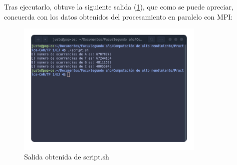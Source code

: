Tras ejecutarlo, obtuve la siguiente salida (\ref{fig:salidaej4}), que como se puede apreciar, concuerda con los datos obtenidos del procesamiento en paralelo con MPI:



\begin{figure}[H]
    \centering
    \includegraphics[width=0.80\textwidth]{Images/Captura desde 2023-08-29 16-57-42.png}
    \caption{Salida obtenida de script.sh}
    \label{fig:salidaej4}
\end{figure}